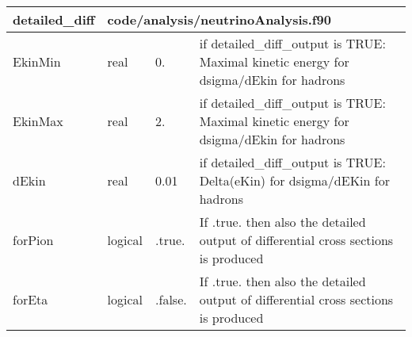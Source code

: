 \documentclass{article}
\begin{document}
\begin{longtable}{llll}
\toprule
\textbf{\large{detailed\_diff}} & \multicolumn{3}{l}{\footnotesize{code/analysis/neutrinoAnalysis.f90}}\\*
\midrule
\endfirsthead
\midrule
\endhead
EkinMin & \begin{minipage}[t]{2cm}real\end{minipage} & \begin{minipage}[t]{2cm}0.\end{minipage} & \begin{minipage}[t]{12cm}if detailed\_diff\_output is TRUE: Maximal kinetic energy for dsigma/dEkin for hadrons\end{minipage}\\*
\midrule
EkinMax & \begin{minipage}[t]{2cm}real\end{minipage} & \begin{minipage}[t]{2cm}2.\end{minipage} & \begin{minipage}[t]{12cm}if detailed\_diff\_output is TRUE: Maximal kinetic energy for dsigma/dEkin for hadrons\end{minipage}\\*
\midrule
dEkin & \begin{minipage}[t]{2cm}real\end{minipage} & \begin{minipage}[t]{2cm}0.01\end{minipage} & \begin{minipage}[t]{12cm}if detailed\_diff\_output is TRUE: Delta(eKin) for dsigma/dEKin  for hadrons\end{minipage}\\*
\midrule
forPion & \begin{minipage}[t]{2cm}logical\end{minipage} & \begin{minipage}[t]{2cm}.true.\end{minipage} & \begin{minipage}[t]{12cm}If .true. then also the detailed output of differential cross sections is produced\end{minipage}\\*
\midrule
forEta & \begin{minipage}[t]{2cm}logical\end{minipage} & \begin{minipage}[t]{2cm}.false.\end{minipage} & \begin{minipage}[t]{12cm}If .true. then also the detailed output of differential cross sections is produced\end{minipage}\\*

\end{longtable}
\end{document}

